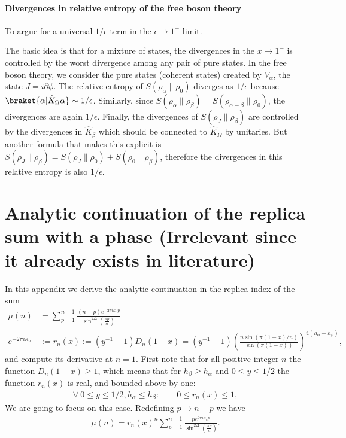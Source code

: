 \documentclass[11pt]{article}
\newcommand{\ep}{\epsilon}
\newcommand{\p}{\partial}
\newcommand{\nn}{\nonumber}
\newcommand{\lb}{\left(}
\newcommand{\rb}{\right)}
\begin{document}
\paragraph{Divergences in relative entropy of the free boson theory}
To argue for a universal $1/\ep$ term in the $\ep\to 1^-$ limit.

The basic idea is that for a mixture of states, the divergences in the $x\to 1^-$ is controlled by the worst divergence among any pair of pure states. In the free boson theory, we consider the pure states (coherent states) created by $V_\alpha$, the state $J=i\p\phi$. The relative entropy of $S(\rho_\alpha\|\rho_0)$ diverges as $1/\ep$ because $\braket{\alpha|\hat{K}_\Omega\alpha}\sim 1/\ep$. Similarly, since $S(\rho_\alpha\|\rho_\beta)=S(\rho_{\alpha-\beta}\|\rho_0)$, the divergences are again $1/\ep$. Finally, the divergences of $S(\rho_{J}\|\rho_\beta)$ are controlled by the divergences in $\hat{K}_\beta$ which should be connected to $\hat{K}_\Omega$ by unitaries. But another formula that makes this explicit is 
$S(\rho_J\|\rho_\beta)=S(\rho_J\|\rho_0)+S(\rho_0\|\rho_\beta)$, therefore the divergences in this relative entropy is also $1/\ep$.



  \appendix
\section{Analytic continuation of the replica sum with a phase (Irrelevant since it already exists in literature)}
\label{app:analytic-continuation}

In this appendix we derive the analytic continuation in the replica index
of the sum
\begin{align}
\mu(n)&=\sum_{p=1}^{n-1}\frac{(n-p)e^{-2\pi i \kappa_n p}}{\sin^{2\Delta}\!\left(\frac{\pi p}{n}\right)}\nn\\
e^{-2\pi i \kappa_n}&:=r_n(x):=(y^{-1}-1)D_n(1-x)=(y^{-1}-1)\lb\frac{n\sin(\pi (1-x)/n)}{\sin(\pi (1-x))} \rb^{4(h_\alpha-h_\beta)},
\end{align}
and compute its derivative at $n=1$. First note that for all positive integer $n$ the function $D_n(1-x)\geq 1$, which means that for $h_\beta\geq h_\alpha$ and $0\leq y\leq 1/2$ the function $r_n(x)$ is real, and bounded above by one:
\begin{align}
  \forall\: 0\leq y\leq 1/2, h_\alpha\leq h_\beta: \qquad 0\leq r_n(x)\leq 1,   
\end{align}
We are going to focus on this case. Redefining $p\to n-p$ we have
\begin{align}
\mu(n)=r_n(x)^{n}\sum_{p=1}^{n-1}\frac{p e^{2\pi i \kappa_n p}}{\sin^{2\Delta}\left(\frac{\pi p}{n}\right)}.
\end{align}
\end{document}
